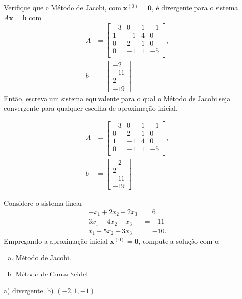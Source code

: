\begin{exer}
  Verifique que o Método de Jacobi, com $\pmb{x}^{(0)} = \pmb{0}$, é divergente para o sistema $A\pmb{x} = \pmb{b}$ com
  \begin{align}
    A &=
        \begin{bmatrix}
          -3& 0& 1& -1\\
          1& -1& 4& 0\\
          0& 2& 1& 0\\
          0& -1& 1& -5\\
        \end{bmatrix},\\
    b &=
        \begin{bmatrix}
          -2\\
          -11\\
          2\\
          -19
        \end{bmatrix}
  \end{align}
  Então, escreva um sistema equivalente para o qual o Método de Jacobi seja convergente para qualquer escolha de aproximação inicial.
\end{exer}
\begin{resp}
  \begin{align}
    A &=
        \begin{bmatrix}
          -3& 0& 1& -1\\
          0& 2& 1& 0\\
          1& -1& 4& 0\\
          0& -1& 1& -5\\
        \end{bmatrix},\\
    b &=
        \begin{bmatrix}
          -2\\
          2\\
          -11\\
          -19
        \end{bmatrix}
  \end{align}  
\end{resp}


\begin{exer}
  Considere o sistema linear
  \begin{equation}
    \begin{aligned}
      -x_1 + 2x_2 - 2x_3 &= 6\\
      3x_1 - 4x_2 + x_3 &= -11\\
      x_1 - 5x_2 + 3x_3 &= -10.
    \end{aligned}
  \end{equation}
  Empregando a aproximação inicial $\pmb{x}^{(0)} = \pmb{0}$, compute a solução com o:
  \begin{enumerate}[a)]
  \item Método de Jacobi.
  \item Método de Gauss-Seidel.
  \end{enumerate}
\end{exer}
\begin{resp}
  a) divergente. b) $(-2, 1, -1)$
\end{resp}

